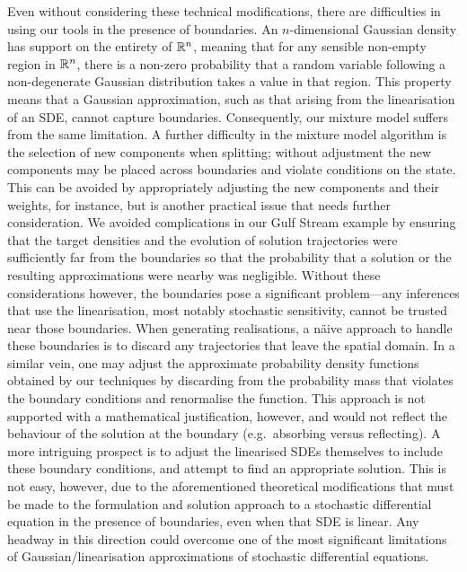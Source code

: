 Even without considering these technical modifications, there are difficulties in using our tools in the presence of boundaries.
An \(n\)-dimensional Gaussian density has support on the entirety of \(\mathbb{R}^n\), meaning that for any sensible non-empty region in \(\mathbb{R}^n\), there is a non-zero probability that a random variable following a non-degenerate Gaussian distribution takes a value in that region.
This property means that a Gaussian approximation, such as that arising from the linearisation of an SDE, cannot capture boundaries.
Consequently, our mixture model suffers from the same limitation.
A further difficulty in the mixture model algorithm is the selection of new components when splitting; without adjustment the new components may be placed across boundaries and violate conditions on the state.
This can be avoided by appropriately adjusting the new components and their weights, for instance, but is another practical issue that needs further consideration.
We avoided complications in our Gulf Stream example by ensuring that the target densities and the evolution of solution trajectories were sufficiently far from the boundaries so that the probability that a solution or the resulting approximations were nearby was negligible.
Without these considerations however, the boundaries pose a significant problem---any inferences that use the linearisation, most notably stochastic sensitivity, cannot be trusted near those boundaries.
When generating realisations, a n\"aive approach to handle these boundaries is to discard any trajectories that leave the spatial domain.
In a similar vein, one may adjust the approximate probability density functions obtained by our techniques by discarding from the probability mass that violates the boundary conditions and renormalise the function.
This approach is not supported with a mathematical justification, however, and would not reflect the behaviour of the solution at the boundary (e.g.\ absorbing versus reflecting).
A more intriguing prospect is to adjust the linearised SDEs themselves to include these boundary conditions, and attempt to find an appropriate solution.
This is not easy, however, due to the aforementioned theoretical modifications that must be made to the formulation and solution approach to a stochastic differential equation in the presence of boundaries, even when that SDE is linear.
Any headway in this direction could overcome one of the most significant limitations of Gaussian/linearisation approximations of stochastic differential equations.



